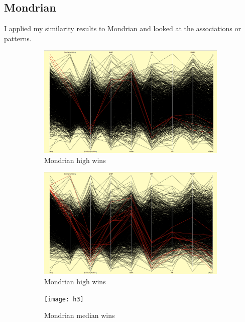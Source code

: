 \documentclass[12pt]{article}
\numberwithin{equation}{subsection}
\begin{document}
\subsection{Mondrian} %
I applied my similarity results to Mondrian and looked at the associations or patterns.
\begin{figure}[H] 
  \begin{subfigure}[b]{0.5\linewidth}
    \centering
    \includegraphics[width=0.9\linewidth]{h1} 
    \caption{Mondrian high wins} 
    \label{fig5:a} 
    \vspace{4ex}
  \end{subfigure}%
  \begin{subfigure}[b]{0.5\linewidth}
    \centering
    \includegraphics[width=0.9\linewidth]{h2} 
    \caption{Mondrian high wins} 
    \label{fig5:b} 
    \vspace{4ex}
  \end{subfigure} 
  \begin{subfigure}[b]{0.5\linewidth}
    \centering
    \texttt{[image: h3]} 
    \caption{Mondrian median wins} 
    \label{fig5:c} 
  \end{subfigure}%
  \begin{subfigure}[b]{0.5\linewidth}

\end{subfigure}
\end{figure}
\end{document}
